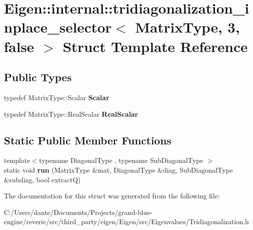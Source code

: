 \hypertarget{struct_eigen_1_1internal_1_1tridiagonalization__inplace__selector_3_01_matrix_type_00_013_00_01false_01_4}{}\section{Eigen\+::internal\+::tridiagonalization\+\_\+inplace\+\_\+selector$<$ Matrix\+Type, 3, false $>$ Struct Template Reference}
\label{struct_eigen_1_1internal_1_1tridiagonalization__inplace__selector_3_01_matrix_type_00_013_00_01false_01_4}
\subsection*{Public Types}
\begin{DoxyCompactItemize}
\item 
\mbox{\label{struct_eigen_1_1internal_1_1tridiagonalization__inplace__selector_3_01_matrix_type_00_013_00_01false_01_4_a5883a03d4f36f351aa6eaa60328a7aa0}} 
typedef Matrix\+Type\+::\+Scalar {\bfseries Scalar}
\item 
\mbox{\label{struct_eigen_1_1internal_1_1tridiagonalization__inplace__selector_3_01_matrix_type_00_013_00_01false_01_4_ad5d2284e77ed0cef41def1a4d78c1690}} 
typedef Matrix\+Type\+::\+Real\+Scalar {\bfseries Real\+Scalar}
\end{DoxyCompactItemize}
\subsection*{Static Public Member Functions}
\begin{DoxyCompactItemize}
\item 
\mbox{\label{struct_eigen_1_1internal_1_1tridiagonalization__inplace__selector_3_01_matrix_type_00_013_00_01false_01_4_ada09c1e35e2754d5486fadbd5000dc5a}} 
{\footnotesize template$<$typename Diagonal\+Type , typename Sub\+Diagonal\+Type $>$ }\\static void {\bfseries run} (Matrix\+Type \&mat, Diagonal\+Type \&diag, Sub\+Diagonal\+Type \&subdiag, bool extractQ)
\end{DoxyCompactItemize}


The documentation for this struct was generated from the following file\+:\begin{DoxyCompactItemize}
\item 
C\+:/\+Users/dante/\+Documents/\+Projects/grand-\/blue-\/engine/reverie/src/third\+\_\+party/eigen/\+Eigen/src/\+Eigenvalues/Tridiagonalization.\+h\end{DoxyCompactItemize}
